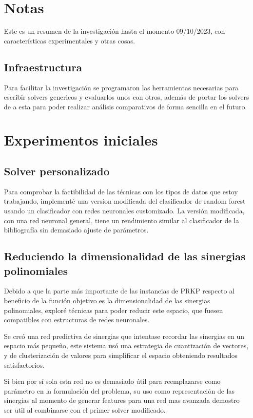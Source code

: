 \documentclass[../Main.tex]{subfiles}
\begin{document}
\section{Notas}
Este es un resumen de la investigación hasta el momento 09/10/2023, con características experimentales y otras cosas.

\subsection{Infraestructura}
Para facilitar la investigación se programaron las herramientas necesarias para escribir solvers genericos y evaluarlos unos con otros, además de portar los solvers de \cite{baldo_polynomial_2023} a esta para poder realizar análisis comparativos de forma sencilla en el futuro.

\section{Experimentos iniciales}

\subsection{Solver personalizado}
Para comprobar la factibilidad de las técnicas con los tipos de datos que estoy trabajando, implementé una version modificada del clasificador de random forest \cite{baldo_polynomial_2023} usando un clasificador con redes neuronales customizado. La versión modificada, con una red neuronal general, tiene un rendimiento similar al clasificador de la bibliografía sin demasiado ajuste de parámetros.

\subsection{Reduciendo la dimensionalidad de las sinergias polinomiales}

Debido a que la parte más importante de las instancias de PRKP respecto al beneficio de la función objetivo es la dimensionalidad de las sinergias polinomiales, exploré técnicas para poder reducir este espacio, que fuesen compatibles con estructuras de redes neuronales.

Se creó una red predictiva de sinergias que intentase recordar las sinergias en un espacio más pequeño, este sistema usó una estrategia de cuantización de vectores, y de clusterización de valores para simplificar el espacio obteniendo resultados satisfactorios.

Si bien por sí sola esta red no es demasiado útil para reemplazarse como parámetro en la formulación del problema, su uso como representación de las sinergias al momento de generar features para una red mas avanzada demostro ser util al combinarse con el primer solver modificado.



\biblio %
\end{document}
